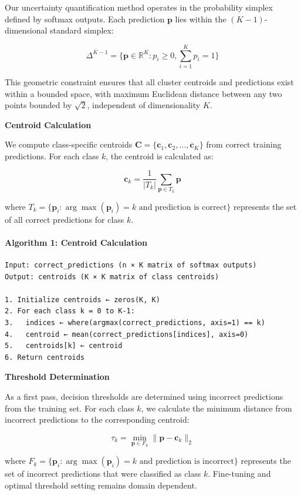 Our uncertainty quantification method operates in the probability simplex defined by softmax outputs. Each prediction $\mathbf{p}$ lies within the $(K-1)$-dimensional standard simplex:

$$\Delta^{K-1} = \{\mathbf{p} \in \mathbb{R}^K : p_i \geq 0, \sum_{i=1}^K p_i = 1\}$$

This geometric constraint ensures that all cluster centroids and predictions exist within a bounded space, with maximum Euclidean distance between any two points bounded by $\sqrt{2}$, independent of dimensionality $K$.

\textbf{Centroid Calculation}

We compute class-specific centroids $\mathbf{C} = \{\mathbf{c}_1, \mathbf{c}_2, \ldots, \mathbf{c}_K\}$ from correct training predictions. For each class $k$, the centroid is calculated as:

$$\mathbf{c}_k = \frac{1}{|T_k|} \sum_{\mathbf{p} \in T_k} \mathbf{p}$$

where $T_k = \{\mathbf{p}_i : \arg\max(\mathbf{p}_i) = k \text{ and prediction is correct}\}$ represents the set of all correct predictions for class $k$.

\paragraph{Algorithm 1: Centroid Calculation}
\begin{verbatim}
Input: correct_predictions (n × K matrix of softmax outputs)
Output: centroids (K × K matrix of class centroids)

1. Initialize centroids ← zeros(K, K)
2. For each class k = 0 to K-1:
3.   indices ← where(argmax(correct_predictions, axis=1) == k)
4.   centroid ← mean(correct_predictions[indices], axis=0)
5.   centroids[k] ← centroid
6. Return centroids
\end{verbatim}

\textbf{Threshold Determination}

As a first pass, decision thresholds are determined using incorrect predictions from the training set. For each class $k$, we calculate the minimum distance from incorrect predictions to the corresponding centroid:

$$\tau_k = \min_{\mathbf{p} \in F_k} \|\mathbf{p} - \mathbf{c}_k\|_2$$

where $F_k = \{\mathbf{p}_i : \arg\max(\mathbf{p}_i) = k \text{ and prediction is incorrect}\}$ represents the set of incorrect predictions that were classified as class $k$. Fine-tuning and optimal threshold setting remains domain dependent.

